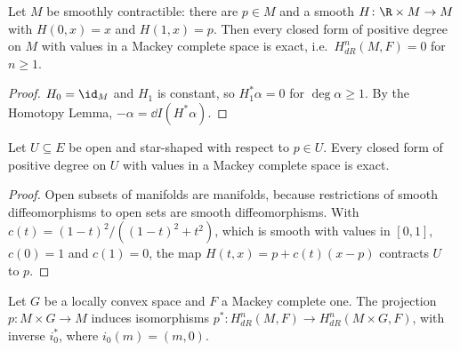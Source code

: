 \begin{theorem}
  \label{thm:poincare}
  \leanok
  Let $M$ be smoothly contractible: there are $p \in M$ and a smooth $H \colon \R \times M \to M$
  with $H(0, x) = x$ and $H(1, x) = p$. Then every closed form of positive degree on $M$ with
  values in a Mackey complete space is exact, i.e.\ $H^n_{dR}(M, F) = 0$ for $n \geq 1$.
\end{theorem}

\begin{proof}
  \leanok
  $H_0 = \id_M$ and $H_1$ is constant, so $H_1^*\alpha = 0$ for $\deg \alpha \geq 1$. By the
  Homotopy Lemma, $-\alpha = \dd I(H^*\alpha)$.
\end{proof}

\begin{corollary}[{\cite[Corollary~3.6.29]{GN26}}]
  \label{cor:poincare-star}
  \leanok
  Let $U \subseteq E$ be open and star-shaped with respect to $p \in U$. Every closed form of
  positive degree on $U$ with values in a Mackey complete space is exact.
\end{corollary}

\begin{proof}
  \leanok
  Open subsets of manifolds are manifolds, because restrictions of smooth diffeomorphisms to open
  sets are smooth diffeomorphisms. With $c(t) = (1 - t)^2/((1 - t)^2 + t^2)$, which is smooth with
  values in $[0, 1]$, $c(0) = 1$ and $c(1) = 0$, the map $H(t, x) = p + c(t)(x - p)$ contracts $U$
  to $p$.
\end{proof}

\begin{corollary}[{\cite[Corollary~3.6.26]{GN26}}]
  \label{cor:de-rham-product}
  \leanok
  Let $G$ be a locally convex space and $F$ a Mackey complete one. The projection
  $p \colon M \times G \to M$ induces isomorphisms
  $p^* \colon H^n_{dR}(M, F) \to H^n_{dR}(M \times G, F)$, with inverse $i_0^*$, where
  $i_0(m) = (m, 0)$.
\end{corollary}

